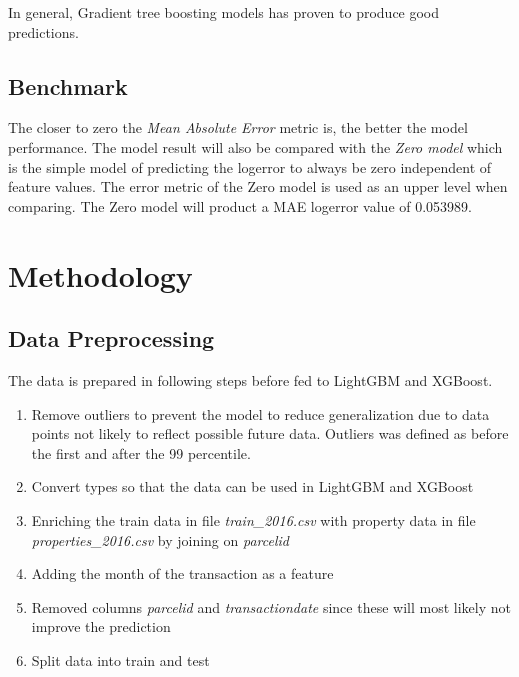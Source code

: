\documentclass[a4paper]{article}
\begin{document}
In general, Gradient tree boosting models has proven to produce good predictions.

\subsection{Benchmark}
The closer to zero the \textit{Mean Absolute Error} metric is, the better the model performance. The model result will also be compared with the \textit{Zero model} which is the simple model of predicting the logerror to always be zero independent of feature values. The error metric of the Zero model is used as an upper level when comparing. The Zero model will product a MAE logerror value of 0.053989.


\section{Methodology}

\subsection{Data Preprocessing}
The data is prepared in following steps before fed to LightGBM and XGBoost.
\begin{enumerate}
    \item Remove outliers to prevent the model to reduce generalization due to data points not likely to reflect possible future data. Outliers was defined as before the first and after the 99 percentile.
    \item Convert types so that the data can be used in LightGBM and XGBoost
    \item Enriching the train data in file \textit{train\_2016.csv} with property data in file
        \textit{properties\_2016.csv} by joining on \textit{parcelid}
    \item Adding the month of the transaction as a feature
    \item Removed columns \textit{parcelid} and \textit{transactiondate} since these will most likely not improve the prediction
    \item Split data into train and test
\end{enumerate}
\end{document}

